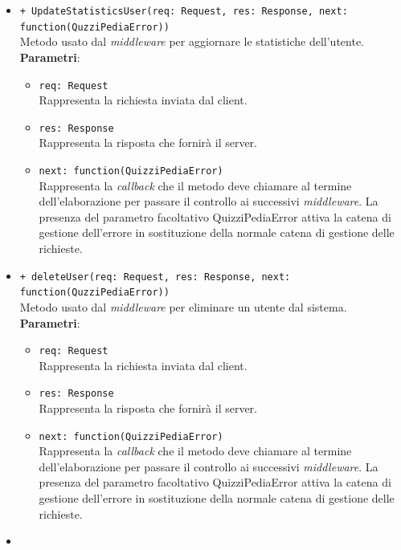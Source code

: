 \begin{itemize}
\begin{itemize}
\begin{itemize}
		 \end{itemize}
		 \item
		\texttt{+ UpdateStatisticsUser(req: Request, res: Response, next: function(QuzziPediaError))} \\
		Metodo usato dal \textit{middleware} per aggiornare le statistiche dell'utente. \\
		\textbf{Parametri}:
		 \begin{itemize}
		  \item
			\texttt{req: Request} \\
			Rappresenta la richiesta inviata dal client.
		  \item
			\texttt{res: Response} \\
			Rappresenta la risposta che fornirà il server.
		  \item
		    \texttt{next: function(QuizziPediaError)} \\
			Rappresenta la \textit{callback} che il metodo deve chiamare al termine dell'elaborazione per passare il controllo ai successivi \textit{middleware}. La presenza del parametro facoltativo QuizziPediaError attiva la catena di gestione dell'errore in sostituzione della normale catena di gestione delle richieste.
		 \end{itemize}
		 \item
		 \texttt{+ deleteUser(req: Request, res: Response, next: function(QuzziPediaError))} \\
		Metodo usato dal \textit{middleware} per eliminare un utente dal sistema. \\
		\textbf{Parametri}:
		 \begin{itemize}
		  \item
			\texttt{req: Request} \\
			Rappresenta la richiesta inviata dal client.
		  \item
			\texttt{res: Response} \\
			Rappresenta la risposta che fornirà il server.
		  \item
		    \texttt{next: function(QuizziPediaError)} \\
			Rappresenta la \textit{callback} che il metodo deve chiamare al termine dell'elaborazione per passare il controllo ai successivi \textit{middleware}. La presenza del parametro facoltativo QuizziPediaError attiva la catena di gestione dell'errore in sostituzione della normale catena di gestione delle richieste.
		 \end{itemize}
		 \item

\end{itemize}
\end{itemize}
